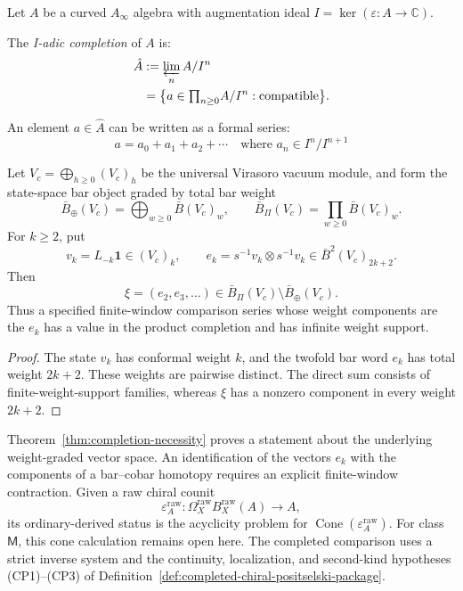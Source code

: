 \begin{definition}
\label{def:i-adic-topology}
Let $A$ be a curved $A_\infty$ algebra with augmentation ideal $I = \ker(\varepsilon: A \to \mathbb{C})$.

The \emph{I-adic completion} of $A$ is:
\begin{align}
\hat{A} &:= \varprojlim_n A/I^n \notag \\
 &= \bigl\{a \in {\textstyle\prod_{n \geq 0}} A/I^n :
 \text{compatible}\bigr\}.
\end{align}

An element $a \in \hat{A}$ can be written as a formal series:
\begin{equation}
a = a_0 + a_1 + a_2 + \cdots \quad \text{where } a_n \in I^n/I^{n+1}
\end{equation}
\end{definition}

\begin{theorem}
\label{thm:completion-necessity}
Let \(V_c=\bigoplus_{h\geq0}(V_c)_h\) be the universal Virasoro
vacuum module, and form the state-space bar object graded by total
bar weight
\[
 \bar B_\oplus(V_c)
 =\bigoplus_{w\geq0}\bar B(V_c)_w,
 \qquad
 \bar B_\Pi(V_c)
 =\prod_{w\geq0}\bar B(V_c)_w .
\]
For \(k\geq2\), put
\[
 v_k=L_{-k}\mathbf1\in(V_c)_k,
 \qquad
 e_k=s^{-1}v_k\otimes s^{-1}v_k
 \in\bar B^2(V_c)_{2k+2}.
\]
Then
\[
 \xi=(e_2,e_3,\ldots)
 \in \bar B_\Pi(V_c)\setminus\bar B_\oplus(V_c).
\]
Thus a specified finite-window comparison series whose weight
components are the \(e_k\) has a value in the product completion and
has infinite weight support.
\end{theorem}

\begin{proof}
The state \(v_k\) has conformal weight \(k\), and the twofold bar word
\(e_k\) has total weight \(2k+2\).  These weights are pairwise
distinct.  The direct sum consists of finite-weight-support families,
whereas \(\xi\) has a nonzero component in every weight \(2k+2\).
\end{proof}

\begin{remark}\label{rem:completion-necessity-scope}
Theorem~\ref{thm:completion-necessity} proves a statement about the
underlying weight-graded vector space.  An identification of the
vectors \(e_k\) with the components of a bar--cobar homotopy requires
an explicit finite-window contraction.  Given a raw chiral counit
\[
 \varepsilon_A^{\mathrm{raw}}\colon
 \Omega_X^{\mathrm{raw}}B_X^{\mathrm{raw}}(A)\longrightarrow A,
\]
its ordinary-derived status is the acyclicity problem for
\(\operatorname{Cone}(\varepsilon_A^{\mathrm{raw}})\).
For class~\(\mathsf M\), this cone calculation remains open here.
The completed comparison uses a strict inverse system and the
continuity, localization, and second-kind hypotheses
\textup{(CP1)--(CP3)} of
Definition~\ref{def:completed-chiral-positselski-package}.
\end{remark}

